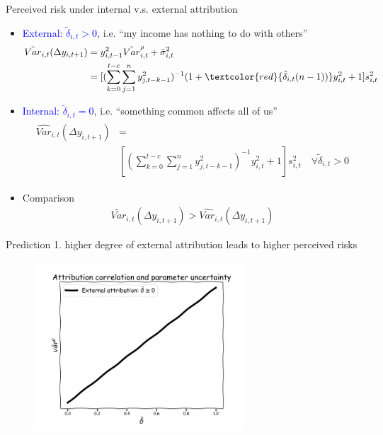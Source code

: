 \documentclass{beamer}
\begin{document}
\begin{frame}{Perceived risk under internal  v.s. external attribution}
	
	\begin{itemize}
		\item \textcolor{blue}{External: $\tilde \delta_{i,t} >0$}, i.e. ``my income has nothing to do with others''
	\begin{eqnarray}
	\begin{split}
	\tilde {Var}_{i,t}(\Delta y_{i,t+1}) & = y_{i,t-1}^2 \tilde{Var}^{\rho}_{i,t} + \tilde{\sigma}^2_{i,t} \\
	& = [(\sum^{t-c}_{k=0}\sum^{n}_{j=1}y^2_{j,t-k-1})^{-1}(1+\textcolor{red}{ \tilde\delta_{i,t}(n-1))}y^2_{i,t} + 1] s^2_{i,t}
	\end{split}
	\end{eqnarray}
		\item \textcolor{blue}{Internal: $\tilde \delta_{i,t} =0$}, i.e. ``something common affects all of us''
		\begin{eqnarray}
	\begin{split}
	\widehat{Var}_{i,t}(\Delta y_{i,t+1}) & = \\
	& [(\sum^{t-c}_{k=0}\sum^{n}_{j=1}y^2_{j,t-k-1})^{-1}y^2_{i,t} + 1] s^2_{i,t} \quad \forall \tilde \delta_{i,t} >0
		\end{split}
	\end{eqnarray}
		\item Comparison
		\begin{eqnarray}
		\tilde {Var}_{i,t}(\Delta y_{i,t+1}) > \widehat{Var}_{i,t}(\Delta y_{i,t+1})
		\end{eqnarray}
	\end{itemize}
	
\end{frame}


\begin{frame}{Prediction 1. higher degree of external attribution leads to higher perceived risks}
	\begin{figure}
		\centering 
		\label{var_experience_var}
		\includegraphics[width=0.7\textwidth]{figures/corr_var.jpg}
	\end{figure}
\end{frame}
\end{document}
